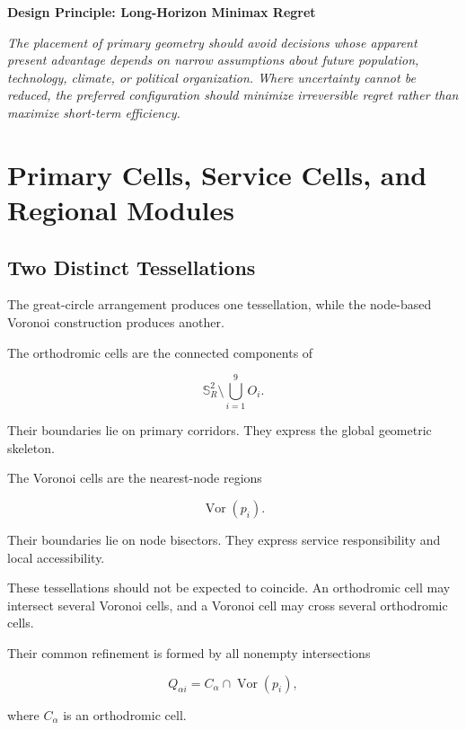 \documentclass[11pt,fleqn]{book}
\numberwithin{equation}{chapter}
\newenvironment{principle}[1]
  {\begin{principleEnv}
   \noindent\textbf{Design Principle: #1}\par\smallskip\itshape}
  {\end{principleEnv}}
\theoremstyle{plain}
\theoremstyle{definition}
\theoremstyle{remark}
\newcommand{\Sphere}{\mathbb{S}^{2}}
\newcommand{\Vor}{\operatorname{Vor}}
\begin{document}
\begin{principle}{Long-Horizon Minimax Regret}
The placement of primary geometry should avoid decisions whose apparent present advantage depends on narrow assumptions about future population, technology, climate, or political organization. Where uncertainty cannot be reduced, the preferred configuration should minimize irreversible regret rather than maximize short-term efficiency.
\end{principle}

\chapter{Primary Cells, Service Cells, and Regional Modules}

\section{Two Distinct Tessellations}

The great-circle arrangement produces one tessellation, while the node-based Voronoi construction produces another.

The orthodromic cells are the connected components of

\begin{equation}
    \Sphere_R
    \setminus
    \bigcup_{i=1}^{9}O_i.
\end{equation}

Their boundaries lie on primary corridors. They express the global geometric skeleton.

The Voronoi cells are the nearest-node regions

\begin{equation}
    \Vor(p_i).
\end{equation}

Their boundaries lie on node bisectors. They express service responsibility and local accessibility.

These tessellations should not be expected to coincide. An orthodromic cell may intersect several Voronoi cells, and a Voronoi cell may cross several orthodromic cells.

Their common refinement is formed by all nonempty intersections

\begin{equation}
    Q_{\alpha i}
    =
    C_\alpha
    \cap
    \Vor(p_i),
\end{equation}

where \(C_\alpha\) is an orthodromic cell.
\end{document}
